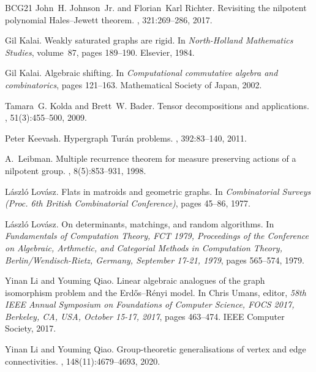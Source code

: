 \begin{thebibliography}{BCG{\etalchar{+}}21}
John~H. Johnson~Jr. and Florian~Karl Richter.
\newblock Revisiting the nilpotent polynomial {Hales}--{Jewett} theorem.
, 321:269--286, 2017.

Gil Kalai.
\newblock Weakly saturated graphs are rigid.
\newblock In {\em North-Holland Mathematics Studies}, volume~87, pages
  189--190. Elsevier, 1984.

Gil Kalai.
\newblock Algebraic shifting.
\newblock In {\em Computational commutative algebra and combinatorics}, pages
  121--163. Mathematical Society of Japan, 2002.

Tamara~G. Kolda and Brett~W. Bader.
\newblock Tensor decompositions and applications.
, 51(3):455--500, 2009.

Peter Keevash.
\newblock Hypergraph {Tur{\'a}n} problems.
, 392:83--140, 2011.

A.~Leibman.
\newblock Multiple recurrence theorem for measure preserving actions of a
  nilpotent group.
, 8(5):853--931, 1998.

L{\'a}szl{\'o} Lov{\'a}sz.
\newblock Flats in matroids and geometric graphs.
\newblock In {\em Combinatorial Surveys (Proc. 6th British Combinatorial
  Conference)}, pages 45--86, 1977.

L{\'{a}}szl{\'{o}} Lov{\'{a}}sz.
\newblock On determinants, matchings, and random algorithms.
\newblock In {\em Fundamentals of Computation Theory, {FCT} 1979, Proceedings
  of the Conference on Algebraic, Arthmetic, and Categorial Methods in
  Computation Theory, Berlin/Wendisch-Rietz, Germany, September 17-21, 1979},
  pages 565--574, 1979.

Yinan Li and Youming Qiao.
\newblock Linear algebraic analogues of the graph isomorphism problem and the
  {Erd{\H{o}}s}--{R{\'{e}}nyi} model.
\newblock In Chris Umans, editor, {\em 58th {IEEE} Annual Symposium on
  Foundations of Computer Science, {FOCS} 2017, Berkeley, CA, USA, October
  15-17, 2017}, pages 463--474. {IEEE} Computer Society, 2017.

Yinan Li and Youming Qiao.
\newblock Group-theoretic generalisations of vertex and edge connectivities.
, 148(11):4679--4693, 2020.


\end{thebibliography}
